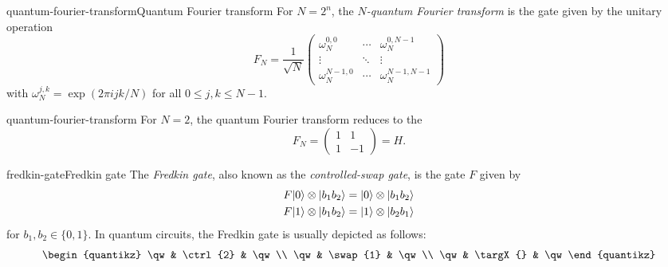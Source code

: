 \begin{topic}{quantum-fourier-transform}{Quantum Fourier transform}
    For $N = 2^n$, the \emph{$N$-quantum Fourier transform} is the  gate given by the unitary operation
    \[ F_N = \frac{1}{\sqrt{N}} \begin{pmatrix}
        \omega_N^{0, 0} & \cdots & \omega_N^{0, N - 1} \\
        \vdots & \ddots & \vdots \\
        \omega_N^{N - 1, 0} & \cdots & \omega_N^{N - 1, N - 1}
    \end{pmatrix} \]
    with $\omega_N^{j, k} = \exp(2 \pi i j k / N)$ for all $0 \le j, k \le N - 1$.
\end{topic}

\begin{example}{quantum-fourier-transform}
    For $N = 2$, the quantum Fourier transform reduces to the 
    \[ F_N = \begin{pmatrix} 1 & 1 \\ 1 & -1 \end{pmatrix} = H . \]
\end{example}

\begin{topic}{fredkin-gate}{Fredkin gate}
    The \emph{Fredkin gate}, also known as the \emph{controlled-swap gate}, is the  gate $F$ given by
    \[ \begin{aligned}
        F |0\rangle \otimes |b_1 b_2\rangle &= |0\rangle \otimes |b_1 b_2\rangle \\
        F |1\rangle \otimes |b_1 b_2\rangle &= |1\rangle \otimes |b_2 b_1\rangle
    \end{aligned} \]
    for $b_1, b_2 \in \{ 0, 1 \}$. In quantum circuits, the Fredkin gate is usually depicted as follows:
    \[ \svg \begin{quantikz}
        \qw & \ctrl{2} & \qw \\
        \qw & \swap{1} & \qw \\
        \qw & \targX{} & \qw
    \end{quantikz} \]
\end{topic}

